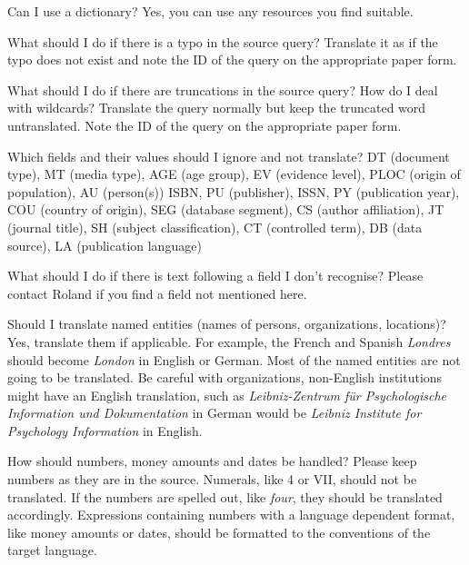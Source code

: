 \documentclass[a4paper,10pt]{article}
\newenvironment{faq}{\begin{description}[style=nextline]}{\end{description}}
\newcommand{\cris}[1]{{\color{red}{#1}}}
\begin{document}
\begin{faq}

  \item[Can I use a dictionary?]
 Yes, you can use any resources you find suitable.
  
  \item[What should I do if there is a typo in the source query?]
    Translate it as if the typo does not exist and note the ID of the query on the appropriate paper form.

  \item[What should I do if there are truncations in the source query? How do I deal with wildcards?]
    Translate the query normally but keep the truncated word untranslated. Note the ID of the query on the appropriate paper form.


    
  \item[Which fields and their values should I ignore and not translate?]
  DT (document type), MT (media type), AGE (age group), EV (evidence level), PLOC (origin of population), AU (person(s))
  ISBN, PU (publisher), ISSN, PY (publication year), COU (country of origin), SEG (database segment), CS (author affiliation), JT (journal title), SH (subject classification), CT (controlled term), DB (data source), LA (publication language)
  
  \item[What should I do if there is text following a field I don't recognise?]
    Please contact Roland if you find a field not mentioned here.
    
  \item[Should I translate named entities (names of persons, organizations, locations)?]
Yes, translate them if applicable. For example, the French and Spanish \textit{Londres} should become \textit{London} in English or German. Most of the named entities are not going to be translated. Be careful with organizations, non-English institutions might have an English translation, such as \textit{Leibniz-Zentrum f\"ur Psychologische Information und Dokumentation} in German would be \textit{Leibniz Institute for Psychology Information} in English. 

\item[How should numbers, money amounts and dates be handled?]
Please keep numbers as they are in the source. Numerals, like 4 or VII, should not be translated. If the numbers are spelled out, like \emph{four}, they should be translated accordingly. Expressions containing numbers with a language dependent format, like money amounts or dates, should be formatted to the conventions of the target language.
    
\end{faq}
\end{document}

